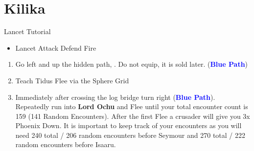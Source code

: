 \chapter{Kilika}
\begin{battle}{Lancet Tutorial}
	\begin{itemize}
		\item \sd
		      \kimahrif Lancet
		      \kimahrif Attack
		      \tidusf Defend
		      \luluf Fire
	\end{itemize}
\end{battle}
\begin{enumerate}[resume]
	\item Go left and up the hidden path, . Do not equip, it is sold later. (\textbf{\textcolor{blue}{Blue Path}})
	\item Teach Tidus Flee via the Sphere Grid
	\item Immediately after crossing the log bridge turn right (\textbf{\textcolor{blue}{Blue Path}}). Repeatedly run into \textbf{Lord Ochu} and Flee until your total encounter count is 159 (141 Random Encounters). After the first Flee a crusader will give you 3x Phoenix Down. It is important to keep track of your encounters as you will need 240 total / 206 random encounters before Seymour and 270 total / 222 random encounters before Isaaru.
\end{enumerate}
